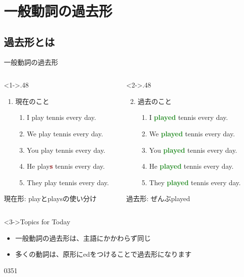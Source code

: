 \documentclass[aspectratio=169,xcolor={dvipsnames,table}]{beamer}
\newcommand{\myaudio}[1]{\href{#1}{\faVolumeUp}}
\begin{document}
\section{一般動詞の過去形}

\subsection{過去形とは}
\begin{frame}[plain]{一般動詞の過去形}
 \large

\begin{columns}
\begin{column}<1->{.48\textwidth}
\begin{enumerate}
 \item 現在のこと
       \begin{enumerate}
	\item I play tennis every day.
	\item We play tennis every day.
	\item You play tennis every day.
	\item He play\textcolor{Maroon}{\bfseries s} tennis every day.
	\item They play tennis every day.
       \end{enumerate}
\end{enumerate}

{\small 現在形: playとplaysの使い分け}
\end{column}
\begin{column}<2->{.48\textwidth}
\begin{enumerate}
\setcounter{enumi}{1} \item 過去のこと
        \begin{enumerate}
	\item I \textcolor{ForestGreen}{\bfseries played} tennis every day.
	\item We \textcolor{ForestGreen}{\bfseries played} tennis every day.
	\item You \textcolor{ForestGreen}{\bfseries played} tennis every day.
	\item He \textcolor{ForestGreen}{\bfseries played} tennis every day.
	\item They \textcolor{ForestGreen}{\bfseries played} tennis every day.
       \end{enumerate}
\end{enumerate}

{\small 過去形: ぜんぶplayed}
\end{column}
\end{columns}

\vfill

\begin{block}<3->{Topics for Today}\small
\begin{itemize}[square]
 \item 一般動詞の過去形は、主語にかかわらず同じ
 \item 多くの動詞は、原形にedをつけることで過去形になります
\end{itemize}
\end{block}

\hfill{\tiny 0351}\,{\scriptsize \myaudio{./audio/025_past_do_01.mp3}}
\end{frame}
\end{document}
